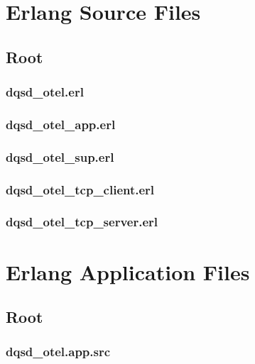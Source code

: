 \section{Erlang Source Files}

\subsection*{Root}

\subsubsection*{dqsd\_otel.erl}


\subsubsection*{dqsd\_otel\_app.erl}


\subsubsection*{dqsd\_otel\_sup.erl}


\subsubsection*{dqsd\_otel\_tcp\_client.erl}


\subsubsection*{dqsd\_otel\_tcp\_server.erl}


\section{Erlang Application Files}

\subsection*{Root}

\subsubsection*{dqsd\_otel.app.src}

